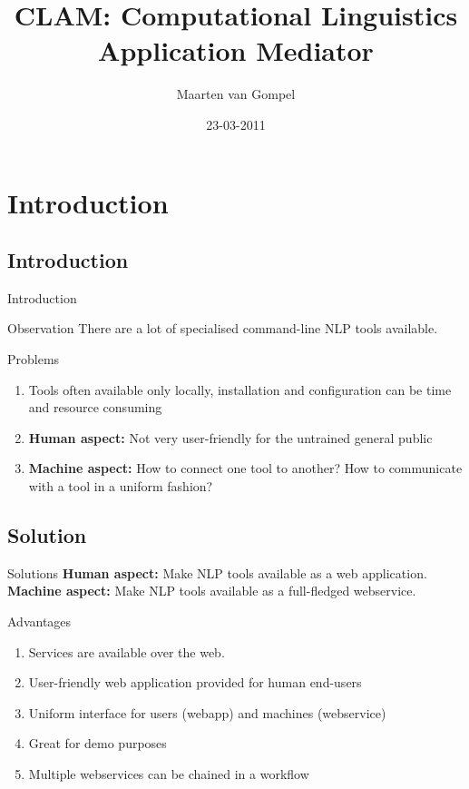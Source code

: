 \documentclass[compress]{beamer}
\title{CLAM: Computational Linguistics Application Mediator}
\author{Maarten van Gompel}
\date{23-03-2011}
\begin{document}
\begin{frame}
	\titlepage\smallraccoon\ilkuvt
\end{frame}

\section{Introduction}

\subsection{Introduction}
\begin{frame}{Introduction}

    \begin{block}{Observation}
        There are a lot of specialised command-line NLP tools available.
    \end{block}

    \begin{block}{Problems}        
        \begin{enumerate}        
            \item Tools often available only locally, installation and configuration can be time and resource consuming
            \item \textbf{Human aspect:} Not very user-friendly for the untrained general public
            \item \textbf{Machine aspect:} How to connect one tool to another? How to communicate with a tool in a uniform fashion?
        \end{enumerate}
    \end{block}
\end{frame}


\subsection{Solution}
\begin{frame}
    \begin{block}{Solutions} 
        \textbf{Human aspect:}   Make NLP tools available as a web application.
        \textbf{Machine aspect:} Make NLP tools available as a full-fledged webservice.
    \end{block}

    \begin{block}{Advantages}

        \begin{enumerate}
            \item Services are available over the web.
            \item User-friendly web application provided for human end-users
            \item Uniform interface for users (webapp) and machines (webservice)
            \item Great for demo purposes
            \item Multiple webservices can be chained in a workflow
        \end{enumerate}

    \end{block}
\end{frame}
\end{document}
